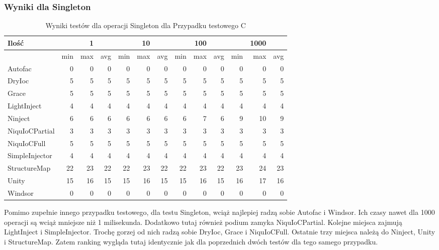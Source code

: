 \documentclass[12pt]{article}
\begin{document}
\subsubsection{Wyniki dla Singleton}
\begin{table}[H]
\captionsetup{belowskip=0pt,aboveskip=0pt}
\begin{center}
\begin{small}
	\begin{tabular}{ | l | r r r | r r r | r r r | r r r | }
    		\hline
Ilość & & 1 & & & 10 & & & 100 & & & 1000 & \\ \hline
 & min & max & avg & min & max & avg & min & max & avg & min & max & avg \\ \hline
Autofac & 0 & 0 & 0 & 0 & 0 & 0 & 0 & 0 & 0 & 0 & 0 & 0 \\ \hline
DryIoc & 5 & 5 & 5 & 5 & 5 & 5 & 5 & 5 & 5 & 5 & 5 & 5 \\ \hline
Grace & 5 & 5 & 5 & 5 & 5 & 5 & 5 & 5 & 5 & 5 & 5 & 5 \\ \hline
LightInject & 4 & 4 & 4 & 4 & 4 & 4 & 4 & 4 & 4 & 4 & 4 & 4 \\ \hline
Ninject & 6 & 6 & 6 & 6 & 6 & 6 & 6 & 7 & 6 & 9 & 10 & 9 \\ \hline
NiquIoCPartial & 3 & 3 & 3 & 3 & 3 & 3 & 3 & 3 & 3 & 3 & 3 & 3 \\ \hline
NiquIoCFull & 5 & 5 & 5 & 5 & 5 & 5 & 5 & 5 & 5 & 5 & 5 & 5 \\ \hline
SimpleInjector & 4 & 4 & 4 & 4 & 4 & 4 & 4 & 4 & 4 & 4 & 4 & 4 \\ \hline
StructureMap & 22 & 23 & 22 & 22 & 23 & 22 & 22 & 23 & 22 & 23 & 24 & 23 \\ \hline
Unity & 15 & 16 & 15 & 15 & 16 & 15 & 15 & 16 & 15 & 16 & 17 & 16 \\ \hline
Windsor & 0 & 0 & 0 & 0 & 0 & 0 & 0 & 0 & 0 & 0 & 0 & 0 \\ \hline
  	\end{tabular}
\end{small}
\end{center}
\caption{Wyniki testów dla operacji Singleton dla Przypadku testowego C}
\label{TestCaseC_Singleton}
\end{table}
Pomimo zupełnie innego przypadku testowego, dla testu Singleton, wciąż najlepiej radzą sobie Autofac i Windsor. Ich czasy nawet dla 1000 operacji są wciąż mniejsze niż 1 milisekunda. Dodatkowo tutaj również podium zamyka NiquIoCPartial. Kolejne miejsca zajmują LightInject i SimpleInjector. Trochę gorzej od nich radzą sobie DryIoc, Grace i NiquIoCFull. Ostatnie trzy miejsca należą do Ninject, Unity i StructureMap. Zatem ranking wygląda tutaj identycznie jak dla poprzednich dwóch testów dla tego samego przypadku.
\end{document}
